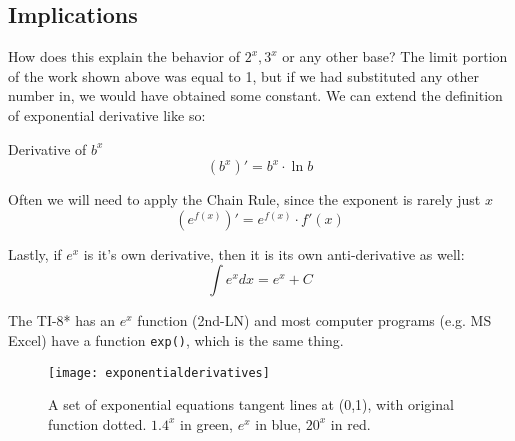 \subsection{Implications}
How does this explain the behavior of $2^x, 3^x$ or any other base?  The limit portion of
the work shown above was equal to 1, but if we had substituted any other number in,
we would have obtained some constant.  We can extend the definition of exponential
derivative like so:

\begin{derivation}{Derivative of $b^x$}
$$
(b^x)' = b^x \cdot{} \ln{b}
$$
\end{derivation}

Often we will need to apply the Chain Rule, since the exponent is rarely just $x$
$$
\left(e^{f(x)}\right)' = e^{f(x)} \cdot f'(x)
$$

Lastly, if $e^x$ is it's own derivative, then it is its own anti-derivative as well:
$$
\int e^xdx = e^x + C
$$

The TI-8* has an $e^x$ function (2nd-LN) and most computer programs (e.g. MS Excel)
have a function \texttt{exp()}, which is the same thing.

\begin{figure}
\begin{centering}
\texttt{[image: exponentialderivatives]}
\caption[Exponential tangent lines at (0,1)]{A set of exponential equations tangent lines at (0,1), with original function dotted.  $1.4^x$ in green, $e^x$ in blue, $20^x$ in red.}
\end{centering}
\end{figure}